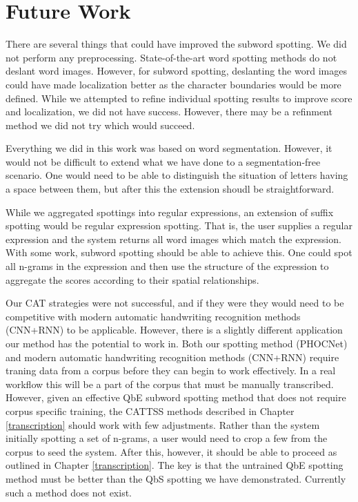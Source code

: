 \documentclass[ms,electronic,twosidetoc,letterpaper,chaptercenter,parttop,lof,lot]{byumsphd}
\begin{document}
\section{Future Work}



There are several things that could have improved the subword spotting. We did not perform any preprocessing. State-of-the-art word spotting methods do not deslant word images. However, for subword spotting, deslanting the word images could have made localization better as the character boundaries would be more defined. While we attempted to refine individual spotting results to improve score and localization, we did not have success. However, there may be a refinment method we did not try which would succeed.

Everything we did in this work was based on word segmentation. However, it would not be difficult to extend what we have done to a segmentation-free scenario. One would need to be able to distinguish the situation of letters having a space between them, but after this  the extension shoudl be straightforward.

While we aggregated spottings into regular expressions, an extension of suffix spotting would be regular expression spotting. That is, the user supplies a regular expression and the system returns all word images which match the expression. With some work, subword spotting should be able to achieve this. One could spot all n-grams in the expression and then use the structure of the expression to aggregate the scores according to their spatial relationships.

Our CAT strategies were not successful, and if they were they would need to be competitive with modern automatic handwriting recognition methods (CNN+RNN) to be applicable. However, there is a slightly different application our method has the potential to work in.
Both our spotting method (PHOCNet) and modern automatic handwriting recognition methods (CNN+RNN) require traning data from a corpus before they can begin to work effectively. In a real workflow this will be a part of the corpus that must be manually transcribed. However, given an effective QbE subword spotting method that does not require corpus specific training, the CATTSS methods described in Chapter \ref{transcription} should work with few adjustments. Rather than the system initially spotting a set of n-grams, a user would need to crop a few from the corpus to seed the system. After this, however, it should be able to proceed as outlined in Chapter \ref{transcription}.
The key is that the untrained QbE spotting method must be better than the QbS spotting we have demonstrated. Currently such a method does not exist.
\end{document}
